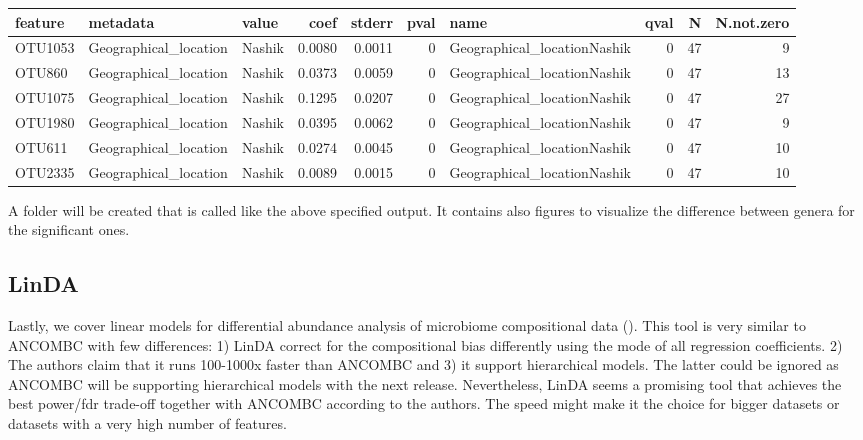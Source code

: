 \documentclass[
]{book}
\begin{document}
\begin{tabular}{l|l|l|r|r|r|l|r|r|r}
\hline
feature & metadata & value & coef & stderr & pval & name & qval & N & N.not.zero\\
\hline
OTU1053 & Geographical\_location & Nashik & 0.0080 & 0.0011 & 0 & Geographical\_locationNashik & 0 & 47 & 9\\
\hline
OTU860 & Geographical\_location & Nashik & 0.0373 & 0.0059 & 0 & Geographical\_locationNashik & 0 & 47 & 13\\
\hline
OTU1075 & Geographical\_location & Nashik & 0.1295 & 0.0207 & 0 & Geographical\_locationNashik & 0 & 47 & 27\\
\hline
OTU1980 & Geographical\_location & Nashik & 0.0395 & 0.0062 & 0 & Geographical\_locationNashik & 0 & 47 & 9\\
\hline
OTU611 & Geographical\_location & Nashik & 0.0274 & 0.0045 & 0 & Geographical\_locationNashik & 0 & 47 & 10\\
\hline
OTU2335 & Geographical\_location & Nashik & 0.0089 & 0.0015 & 0 & Geographical\_locationNashik & 0 & 47 & 10\\
\hline
\end{tabular}

A folder will be created that is called like the above specified
output. It contains also figures to visualize the difference between
genera for the significant ones.

\hypertarget{linda}{%
\subsection{LinDA}\label{linda}}

Lastly, we cover linear models for differential abundance analysis of
microbiome compositional data (\citet{Zhou2022}). This tool is very similar
to ANCOMBC with few differences: 1) LinDA correct for the
compositional bias differently using the mode of all regression
coefficients. 2) The authors claim that it runs 100-1000x faster than
ANCOMBC and 3) it support hierarchical models. The latter could be
ignored as ANCOMBC will be supporting hierarchical models with the
next release. Nevertheless, LinDA seems a promising tool that achieves
the best power/fdr trade-off together with ANCOMBC according to the
authors. The speed might make it the choice for bigger datasets or
datasets with a very high number of features.
\end{document}
